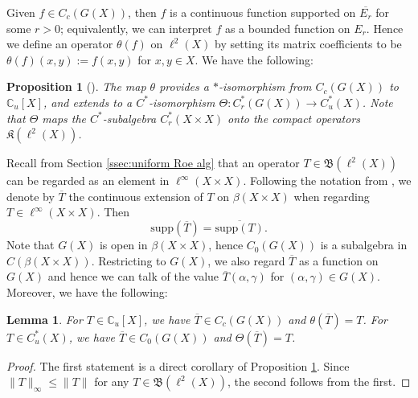 \documentclass[12pt, a4paper]{amsart}
\numberwithin{equation}{section}
\newtheorem{lem}[thm]{Lemma}
\newtheorem{prop}[thm]{Proposition}
\theoremstyle{definition}
\theoremstyle{remark}
\def\CC{\mathbb{C}}
\def\B{\mathfrak{B}}
\def\supp{\mathrm{supp}}
\begin{document}
Given $f \in C_c(G(X))$, then $f$ is a continuous function supported on $\overline{E_r}$ for some $r>0$; equivalently, we can interpret $f$ as a bounded function on $E_r$. Hence we define an operator $\theta(f)$ on $\ell^2(X)$ by setting its matrix coefficients to be $\theta(f)(x,y):=f(x,y)$ for $x,y\in X$. We have the following:

\begin{prop}[{\cite[Proposition 10.29]{Roe03}}]\label{prop: groupoid char for uniform Roe alg}
The map $\theta$ provides a $\ast$-isomorphism from $C_c(G(X))$ to $\CC_u[X]$, and extends to a $C^*$-isomorphism $\Theta: C^*_r(G(X)) \to C^*_u(X)$. Note that $\Theta$ maps the $C^*$-subalgebra $C^*_r(X \times X)$ onto the compact operators $\mathfrak{K}(\ell^2(X))$. 
\end{prop}


Recall from Section \ref{ssec:uniform Roe alg} that an operator $T \in \B(\ell^2(X))$ can be regarded as an element in $\ell^\infty(X \times X)$. Following the notation from \cite{CW04}, we denote by $\overline{T}$ the continuous extension of $T$ on $\beta(X \times X)$ when regarding $T \in \ell^\infty(X \times X)$. Then
\[
\supp(\overline{T}) = \overline{\supp(T)}.
\]
Note that $G(X)$ is open in $\beta(X \times X)$, hence $C_0(G(X))$ is a subalgebra in $C(\beta(X \times X))$. Restricting to $G(X)$, we also regard $\overline{T}$ as a function on $G(X)$ and hence we can talk of the value $\overline{T}(\alpha, \gamma)$ for $(\alpha, \gamma) \in G(X)$. Moreover, we have the following:

\begin{lem}\label{lem: unif. Roe belongs to C0}
For $T \in \CC_u[X]$, we have $\overline{T} \in C_c(G(X))$ and $\theta(\overline{T})=T$. For $T \in C^*_u(X)$, we have $\overline{T} \in C_0(G(X))$ and $\Theta(\overline{T}) = T$. 
\end{lem}

\begin{proof}
The first statement is a direct corollary of Proposition \ref{prop: groupoid char for uniform Roe alg}. Since $\|T\|_\infty \leq \|T\|$ for any $T \in \B(\ell^2(X))$, the second follows from the first.
\end{proof}



\end{document}
